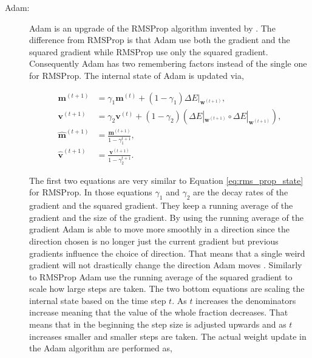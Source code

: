 \begin{description}
    \item[\gls{Adam}:]

        \gls{Adam} is an upgrade of the \gls{RMSProp} algorithm invented by
        \citet{DBLP:journals/corr/KingmaB14}. The difference from \gls{RMSProp}
        is that \gls{Adam} use both the gradient and the squared gradient while
        \gls{RMSProp} use only the squared gradient. Consequently \gls{Adam} has
        two remembering factors instead of the single one for \gls{RMSProp}. The
        internal state of \gls{Adam} is updated via,

        \begin{align}
            \mathbf{m}^{(t+1)} &=
                \gamma_1\mathbf{m}^{(t)} +
                (1 - \gamma_1) \Delta E|_{\mathbf{w}^{(t+1)}}, \\
            \mathbf{v}^{(t+1)} &=
                \gamma_2\mathbf{v}^{(t)} +
                (1 - \gamma_2) \left(
                    \Delta E|_{\mathbf{w}^{(t+1)}} \circ \Delta E|_{\mathbf{w}^{(t+1)}}
                \right), \\
            \mathbf{\hat{m}}^{(t+1)} &=
                \frac{\mathbf{m}^{(t+1)}}{1 - \gamma_1^{t + 1}}, \\
            \mathbf{\hat{v}}^{(t+1)} &=
                \frac{\mathbf{v}^{(t+1)}}{1 - \gamma_2^{t + 1}}.
        \end{align}

        The first two equations are very similar to Equation
        \eqref{eq:rms_prop_state} for \gls{RMSProp}. In those equations
        $\gamma_1$ and $\gamma_2$ are the decay rates of the gradient and the
        squared gradient. They keep a running average of the gradient and the
        size of the gradient. By using the running average of the gradient
        \gls{Adam} is able to move more smoothly in a direction since the
        direction chosen is no longer just the current gradient but previous
        gradients influence the choice of direction. That means that a single
        weird gradient will not drastically change the direction \gls{Adam}
        moves \citep{DBLP:journals/corr/KingmaB14}. Similarly to \gls{RMSProp}
        \gls{Adam} use the running average of the squared gradient to scale how
        large steps are taken. The two bottom equations are scaling the internal
        state based on the time step $t$. As $t$ increases the denominators
        increase meaning that the value of the whole fraction decreases. That
        means that in the beginning the step size is adjusted upwards and as $t$
        increases smaller and smaller steps are taken. The actual weight update
        in the \gls{Adam} algorithm are performed as,


\end{description}
